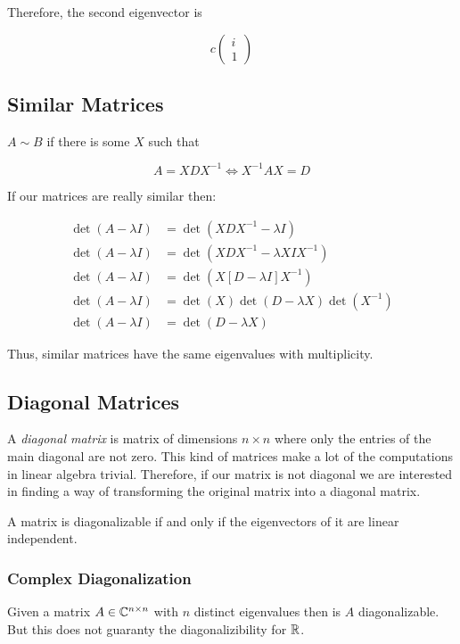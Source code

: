Therefore, the second eigenvector is 

\[  
    c
    \begin{pmatrix}
        i \\
        1        
    \end{pmatrix}
\]

\subsection{Similar Matrices}

\(A \sim B\) if there is some \(X\) such that 

\[
    A = XDX^{-1} \iff X^{-1}AX = D
\]

If our matrices are really similar then:

\begin{align*}
    \det(A - \lambda I) &= \det(XDX^{-1} - \lambda I)\\
    \det(A - \lambda I) &= \det(XDX^{-1} - \lambda X I X^{-1})\\
    \det(A - \lambda I) &= \det(X[D - \lambda I] X^{-1})\\
    \det(A - \lambda I) &= \det(X)\det(D - \lambda X) \det(X^{-1})\\
    \det(A - \lambda I) &= \det(D - \lambda X) 
\end{align*}

Thus, similar matrices have the same eigenvalues with multiplicity.

\subsection{Diagonal Matrices}

A \emph{diagonal matrix} is matrix of dimensions \(n \times n\) where only the entries of the main diagonal 
are not zero. This kind of matrices make a lot of the computations in linear algebra trivial. Therefore, 
if our matrix is not diagonal we are interested in finding a way of transforming the original matrix 
into a diagonal matrix.

A matrix is diagonalizable if and only if the eigenvectors of it are linear independent.

\subsubsection{Complex Diagonalization}

Given a matrix \(A \in \mathbb{C}^{n \times n}\) with \(n\) distinct eigenvalues then is \(A\)
diagonalizable. But this does not guaranty the diagonalizibility for \(\mathbb{R}\).

